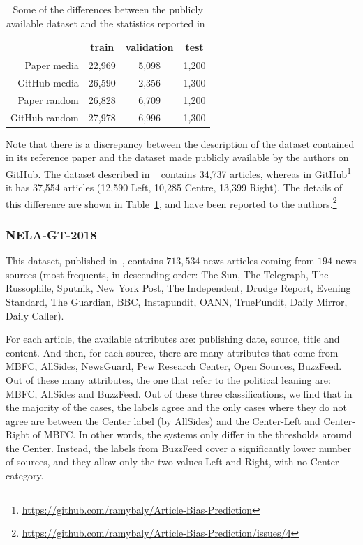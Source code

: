 \begin{table}[!htbp]
   \centering
   \begin{tabular}{r|c|c|c}
       & train & validation & test \\
       \hline
       Paper media & 22,969 & 5,098 & 1,200 \\
       GitHub media & 26,590 & 2,356 & 1,300 \\
       \hline
       Paper random & 26,828 & 6,709 & 1,200 \\
       GitHub random & 27,978 & 6,996 & 1,300
   \end{tabular}
   \caption{Some of the differences between the publicly available dataset and the statistics reported in~\citet{baly2020we}}
   \label{tab:baly_size}
\end{table}

Note that there is a discrepancy between the description of the dataset contained in its reference paper and the dataset made publicly available by the authors on GitHub.
The dataset described in ~\citet{baly2020we} contains 34,737 articles, whereas in GitHub\footnote{\url{https://github.com/ramybaly/Article-Bias-Prediction}} it has 37,554 articles (12,590 Left, 10,285 Centre, 13,399 Right). The details of this difference are shown in Table~\ref{tab:baly_size}, and have been reported to the authors.\footnote{\url{https://github.com/ramybaly/Article-Bias-Prediction/issues/4}}

\subsubsection{NELA-GT-2018}

This dataset, published in~\citet{DVN/ULHLCB_2019}, contains $713,534$ news articles coming from $194$ news sources (most frequents, in descending order: The Sun, The Telegraph, The Russophile, Sputnik, New York Post, The Independent, Drudge Report, Evening Standard, The Guardian, BBC, Instapundit, OANN, TruePundit, Daily Mirror, Daily Caller).

For each article, the available attributes are: publishing date, source, title and content.
And then, for each source, there are many attributes that come from MBFC, AllSides, NewsGuard, Pew Research Center, Open Sources, BuzzFeed. Out of these many attributes, the one that refer to the political leaning are: MBFC, AllSides and BuzzFeed. Out of these three classifications, we find that in the majority of the cases, the labels agree and the only cases where they do not agree are between the Center label (by AllSides) and the Center-Left and Center-Right of MBFC. In other words, the systems only differ in the thresholds around the Center.
Instead, the labels from BuzzFeed cover a significantly lower number of sources, and they allow only the two values Left and Right, with no Center category.

